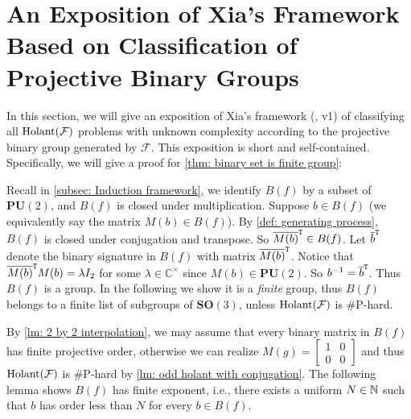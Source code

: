 \section{An Exposition of Xia's Framework Based on Classification of Projective Binary Groups}\label{appendix: mingji}

In this section, we will give an exposition of Xia's framework (\cite{MingjiProgram}, v1) of classifying all $\operatorname{Holant}(\mathcal{F})$ problems with unknown complexity according to the projective binary group generated by $\mathcal{F}$.
This exposition is short and self-contained.
Specifically, we will give a proof for \cref{thm: binary set is finite group}:

\MingjiTheorem*

Recall in \cref{subsec: Induction framework}, we identify $B(f)$ by a subset of $\mathbf{PU}(2)$, and $B(f)$ is closed under multiplication.
Suppose $b\in B(f)$ (we equivalently say the matrix $M(b)\in B(f)$). 
By \cref{def: generating process}, $B(f)$ is closed under conjugation and transpose. 
So $\overline{M(b)}^{\tt T}\in B(f)$.
Let $\overline{b}^{\tt T}$ denote the binary signature in $B(f)$ with matrix $\overline{M(b)}^{\tt T}$.
Notice that $\overline{M(b)}^{\tt T}M(b)=\lambda I_2$ for some $\lambda\in \mathbb
C^{\times}$ since $M(b)\in \mathbf{PU}(2)$.
So $b^{-1}=\overline{b}^{\tt T}$.
Thus $B(f)$ is a group.
In the following we show it is a \emph{finite} group, thus $B(f)$ belongs to a finite list of subgroups of $\mathbf{SO}(3)$, unless $\operatorname{Holant}(\mathcal{F})$ is \#P-hard.
\InterpolationBinary*

By \cref{lm: 2 by 2 interpolation}, we may assume that every binary matrix in $B(f)$ has finite projective order, otherwise we can realize $M(g)=\left[\begin{smallmatrix}
    1 & 0\\
    0 & 0
\end{smallmatrix}\right]$ and thus $\operatorname{Holant}(\mathcal{F})$ is \#P-hard by \cref{lm: odd holant with conjugation}.
The following lemma shows $B(f)$ has finite exponent, i.e., there exists a uniform $N\in \mathbb{N}$ such that $b$ has order less than $N$ for every $b\in B(f)$.

